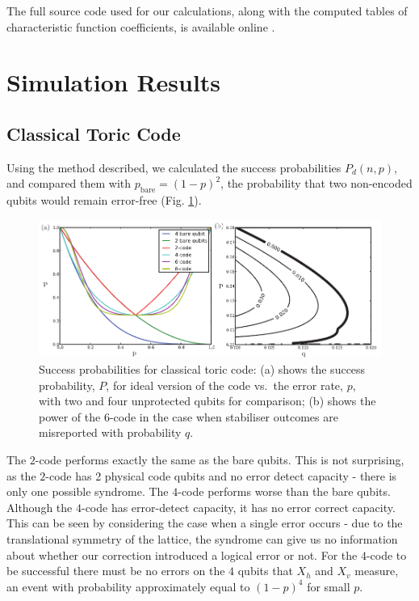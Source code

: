 The full source code used for our calculations, along with the computed tables of characteristic function coefficients, is available online \cite{toric_code_program}.

\section{Simulation Results}

\subsection{Classical Toric Code}

Using the method described, we calculated the success probabilities $P_d(n, p)$, and compared them with $p_{\text{bare}} = (1-p)^2$, the probability that two non-encoded qubits would remain error-free (Fig. \ref{x_results}).
\begin{figure}[htb]
  \begin{center}
    \includegraphics{figures/x_results.pdf}
  \end{center}
  \caption{Success probabilities for classical toric code: (a) shows the success probability, $P$, for ideal version of the code vs.\ the error rate, $p$, with two and four unprotected qubits for comparison; (b) shows the power of the $6$-code in the case when stabiliser outcomes are misreported with probability $q$.}
  \label{x_results}
\end{figure}

The $2$-code performs exactly the same as the bare qubits. This is not surprising, as the $2$-code has 2 physical code qubits and no error detect capacity - there is only one possible syndrome. The $4$-code performs worse than the bare qubits. Although the $4$-code has error-detect capacity, it has no error correct capacity. This can be seen by considering the case when a single error occurs - due to the translational symmetry of the lattice, the syndrome can give us no information about whether our correction introduced a logical error or not. For the $4$-code to be successful there must be no errors on the $4$ qubits that $X_h$ and $X_v$ measure, an event with probability approximately equal to $(1-p)^4$ for small $p$.

